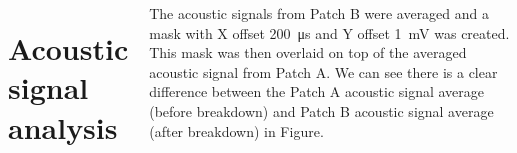 \documentclass[20pt,margin=1in,innermargin=-4.5in,blockverticalspace=-0.25in]{tikzposter}
\begin{document}
\begin{columns}
{    \section*{Acoustic signal analysis}
    The acoustic signals from Patch B were averaged and a mask with X offset \SI[]{200}{\micro\second} and Y offset \SI[]{1}{\milli\volt} was created. This mask was then overlaid on top of the averaged acoustic signal from Patch A. We can see there is a clear difference between the Patch A acoustic signal average (before breakdown) and Patch B acoustic signal average (after breakdown) in Figure. 

    
    
    }



\end{columns}
\end{document}
